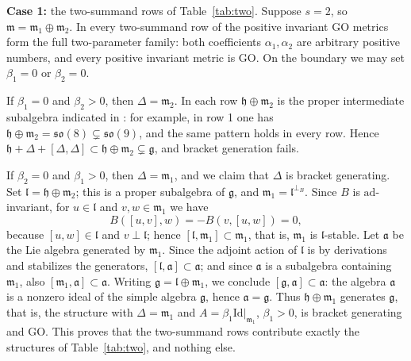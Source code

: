\documentclass[12pt]{amsart}
\theoremstyle{plain}
\theoremstyle{definition}
\theoremstyle{remark}
\newcommand{\alg}[1]{\mathfrak{#1}}
\newcommand{\Idm}{\mathrm{Id}}
\begin{document}
\textbf{Case 1:} the two-summand rows of Table~\ref{tab:two}.
Suppose $s=2$, so $\alg{m}=\alg{m}_1\oplus\alg{m}_2$. In every two-summand row of
\cite[Table~1]{ChenNN} the positive invariant GO metrics form the full two-parameter family: both
coefficients $\alpha_1,\alpha_2$ are arbitrary positive numbers, and every positive invariant
metric is GO. On the boundary we may set $\beta_1=0$ or $\beta_2=0$.

If $\beta_1=0$ and $\beta_2>0$, then $\Delta=\alg{m}_2$. In each row
$\alg{h}\oplus\alg{m}_2$ is the proper intermediate subalgebra indicated in
\cite[Table~1]{ChenNN}: for example, in row 1 one has
$\alg{h}\oplus\alg{m}_2=\alg{so}(8)\subsetneq\alg{so}(9)$, and the same pattern holds in every
row. Hence $\alg{h}+\Delta+[\Delta,\Delta]\subset\alg{h}\oplus\alg{m}_2\subsetneq\alg{g}$, and
bracket generation fails.

If $\beta_2=0$ and $\beta_1>0$, then $\Delta=\alg{m}_1$, and we claim that $\Delta$ is bracket
generating. Set $\alg{l}=\alg{h}\oplus\alg{m}_2$; this is a proper subalgebra of $\alg{g}$, and
$\alg{m}_1=\alg{l}^{\perp_B}$. Since $B$ is $\mathrm{ad}$-invariant, for $u\in\alg{l}$ and
$v,w\in\alg{m}_1$ we have
\[ B([u,v],w)=-B(v,[u,w])=0, \]
because $[u,w]\in\alg{l}$ and $v\perp\alg{l}$; hence $[\alg{l},\alg{m}_1]\subset\alg{m}_1$, that
is, $\alg{m}_1$ is $\alg{l}$-stable. Let $\alg{a}$ be the Lie algebra generated by $\alg{m}_1$.
Since the adjoint action of $\alg{l}$ is by derivations and stabilizes the generators,
$[\alg{l},\alg{a}]\subset\alg{a}$; and since $\alg{a}$ is a subalgebra containing $\alg{m}_1$,
also $[\alg{m}_1,\alg{a}]\subset\alg{a}$. Writing $\alg{g}=\alg{l}\oplus\alg{m}_1$, we conclude
$[\alg{g},\alg{a}]\subset\alg{a}$: the algebra $\alg{a}$ is a nonzero ideal of the simple algebra
$\alg{g}$, hence $\alg{a}=\alg{g}$. Thus $\alg{h}\oplus\alg{m}_1$ generates $\alg{g}$, that is,
the structure with $\Delta=\alg{m}_1$ and $A=\beta_1\Idm|_{\alg{m}_1}$, $\beta_1>0$, is bracket
generating and GO. This proves that the two-summand rows contribute exactly the structures of
Table~\ref{tab:two}, and nothing else.
\end{document}
